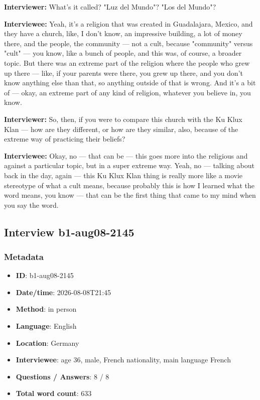 \textbf{Interviewer:} What's it called? "Luz del Mundo"? "Los del Mundo"?

\textbf{Interviewee:} Yeah, it's a religion that was created in Guadalajara, Mexico, and they have a church, like, I don't know, an impressive building, a lot of money there, and the people, the community — not a cult, because "community" versus "cult" — you know, like a bunch of people, and this was, of course, a broader topic. But there was an extreme part of the religion where the people who grew up there — like, if your parents were there, you grew up there, and you don't know anything else than that, so anything outside of that is wrong. And it's a bit of — okay, an extreme part of any kind of religion, whatever you believe in, you know.

\textbf{Interviewer:} So, then, if you were to compare this church with the Ku Klux Klan — how are they different, or how are they similar, also, because of the extreme way of practicing their beliefs?

\textbf{Interviewee:} Okay, no — that can be — this goes more into the religious and against a particular topic, but in a super extreme way. Yeah, no — talking about back in the day, again — this Ku Klux Klan thing is really more like a movie stereotype of what a cult means, because probably this is how I learned what the word means, you know — that can be the first thing that came to my mind when you say the word.

\subsection{Interview b1-aug08-2145}\label{int:b1-aug08-2145}
\subsubsection*{Metadata}
\begin{itemize}
  \item \textbf{ID}: b1-aug08-2145
  \item \textbf{Date/time}: 2026-08-08T21:45
  \item \textbf{Method}: in person
  \item \textbf{Language}: English
  \item \textbf{Location}: Germany
  \item \textbf{Interviewee}: age 36, male, French nationality, main language French
  \item \textbf{Questions / Answers}: 8 / 8
  \item \textbf{Total word count}: 633
\end{itemize}
